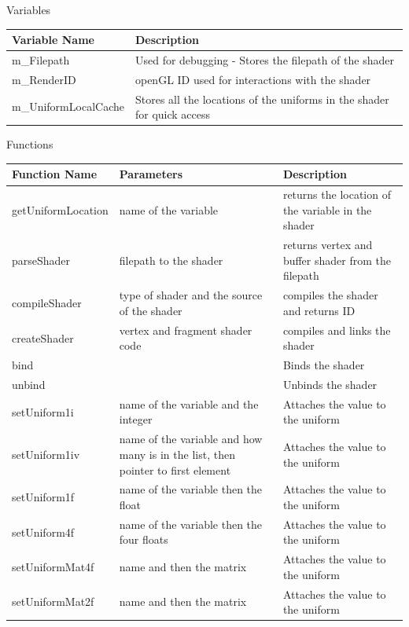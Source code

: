 \documentclass[../../Main.tex]{subfiles}
\begin{document}
    \begin{center}
        Variables
        \begin{tabular}{ | m{} | m{} | }
            \hline
            \textbf{Variable Name} & \textbf{Description} \\
            \hline
            m\_Filepath & Used for debugging - Stores the filepath of the shader \\
            \hline
            m\_RenderID & openGL ID used for interactions with the shader \\
            \hline
            m\_UniformLocalCache & Stores all the locations of the uniforms in the shader for quick access \\
            \hline
        \end{tabular}
        Functions
        \begin{tabular}{ | m{} | m{}| m{} | }
            \hline
            \textbf{Function Name} & \textbf{Parameters} & \textbf{Description} \\
            \hline
            getUniformLocation & name of the variable & returns the location of the variable in the shader \\
            \hline
            parseShader & filepath to the shader & returns vertex and buffer shader from the filepath \\
            \hline
            compileShader & type of shader and the source of the shader & compiles the shader and returns ID \\
            \hline
            createShader & vertex and fragment shader code & compiles and links the shader \\
            \hline
            bind & & Binds the shader \\
            \hline
            unbind & & Unbinds the shader \\
            \hline
            setUniform1i & name of the variable and the integer & Attaches the value to the uniform \\
            \hline
            setUniform1iv & name of the variable and how many is in the list, then pointer to first element & Attaches the value to the uniform \\
            \hline
            setUniform1f & name of the variable then the float & Attaches the value to the uniform \\
            \hline
            setUniform4f & name of the variable then the four floats & Attaches the value to the uniform \\
            \hline
            setUniformMat4f & name and then the matrix & Attaches the value to the uniform \\
            \hline
            setUniformMat2f & name and then the matrix & Attaches the value to the uniform \\
            \hline
        \end{tabular}
    \end{center}
\end{document}
